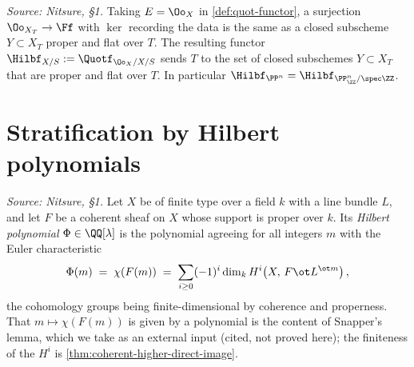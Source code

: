 \begin{definition}
  \label{def:hilbert-functor}
  \textit{Source: Nitsure, §1.}
  Taking $E = \Oo_X$ in \cref{def:quot-functor}, a surjection
  $\Oo_{X_T}\to\Ff$ with $\ker$ recording the data is the same as a closed
  subscheme $Y\subset X_T$ proper and flat over $T$. The resulting functor
  $\Hilbf_{X/S} := \Quotf_{\Oo_X/X/S}$ sends $T$ to the set of closed subschemes
  $Y\subset X_T$ that are proper and flat over $T$. In particular $\Hilbf_{\PP^n}
  = \Hilbf_{\PP^n_{\ZZ}/\spec\ZZ}$.
\end{definition}

\section{Stratification by Hilbert polynomials}

\begin{definition}
  \label{def:hilbert-polynomial}
  \textit{Source: Nitsure, §1.}
  Let $X$ be of finite type over a field $k$ with a line bundle $L$, and let $F$
  be a coherent sheaf on $X$ whose support is proper over $k$. Its \emph{Hilbert
  polynomial} $\Phi\in\QQ[\lambda]$ is the polynomial agreeing for all integers
  $m$ with the Euler characteristic
  \[
    \Phi(m) \;=\; \chi(F(m)) \;=\;
    \sum_{i\ge 0}(-1)^i\dim_k H^i\!\left(X,\, F\ot L^{\ot m}\right),
  \]
  the cohomology groups being finite-dimensional by coherence and properness.
  That $m\mapsto\chi(F(m))$ is given by a polynomial is the content of Snapper's
  lemma, which we take as an external input (cited, not proved here); the
  finiteness of the $H^i$ is \cref{thm:coherent-higher-direct-image}.
\end{definition}

